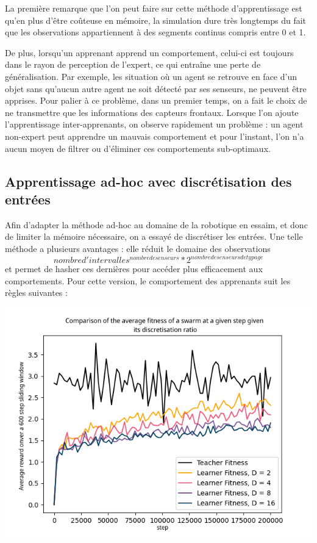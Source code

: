 \documentclass[a4paper, 12pt]{report}
\begin{document}
	La première remarque que l'on peut faire sur cette méthode d'apprentissage est qu'en plus d'être coûteuse en mémoire, la simulation dure très longtemps du fait que les observations appartiennent à des segments continus compris entre 0 et 1.
	
	De plus, lorsqu'un apprenant apprend un comportement, celui-ci est toujours dans le rayon de perception de l'expert, ce qui entraîne une perte de généralisation. Par exemple, les situation où un agent se retrouve en face d'un objet sans qu'aucun autre agent ne soit détecté par ses senseurs, ne peuvent être apprises.
	Pour palier à ce problème, dans un premier temps, on a fait le choix de ne transmettre que les informations des capteurs frontaux.
	Lorsque l'on ajoute l'apprentissage inter-apprenants, on observe rapidement un problème : un agent non-expert peut apprendre un mauvais comportement et pour l'instant, l'on n'a aucun moyen de filtrer ou d'éliminer ces comportements sub-optimaux.
	
	\subsection{Apprentissage ad-hoc avec discrétisation des entrées}
	Afin d'adapter la méthode ad-hoc au domaine de la robotique en essaim, et donc de limiter la mémoire nécessaire, on a essayé de discrétiser les entrées. Une telle méthode a plusieurs avantages : elle réduit le domaine des observations $$nombre d'intervalles^{nombre de senseurs}*2^{nombre de senseurs de typage} $$ et permet de hasher ces dernières pour accéder plus efficacement aux comportements.
	Pour cette version, le comportement des apprenants suit les règles suivantes :
	
	
	
\includegraphics{averageComparisons}
\end{document}
